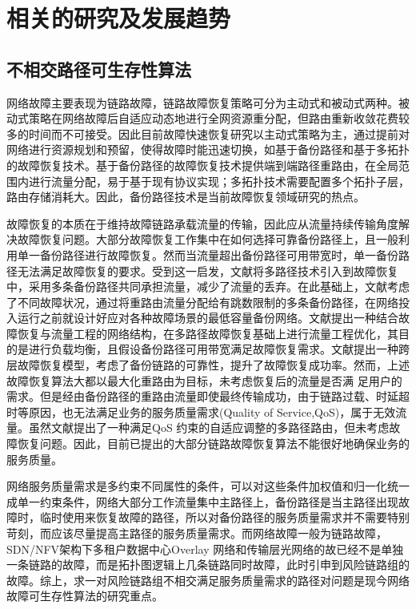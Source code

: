 \section{相关的研究及发展趋势}
\subsection{不相交路径可生存性算法}
网络故障主要表现为链路故障，链路故障恢复策略可分为主动式和被动式两种\cite{kvalbein2006fast,qi2012research}。被动式策略在网络故障后自适应动态地进行全网资源重分配，但路由重新收敛花费较多的时间而不可接受。因此目前故障快速恢复研究以主动式策略为主，通过提前对网络进行资源规划和预留，使得故障时能迅速切换，如基于备份路径和基于多拓扑\cite{shand2010ip}的故障恢复技术。基于备份路径的故障恢复技术提供端到端路径重路由，在全局范围内进行流量分配，易于基于现有协议实现；多拓扑技术需要配置多个拓扑子层，路由存储消耗大。因此，备份路径技术是当前故障恢复领域研究的热点\cite{yang2014keep,wang2010r3,banner2010designing,suchara2011network,zheng2014cross}。

故障恢复的本质在于维持故障链路承载流量的传输，因此应从流量持续传输角度解决故障恢复问题。大部分故障恢复工作集中在如何选择可靠备份路径上，且一般利用单一备份路径进行故障恢复。然而当流量超出备份路径可用带宽时，单一备份路径无法满足故障恢复的要求。受到这一启发，文献\cite{wang2010r3}将多路径技术引入到故障恢复中，采用多条备份路径共同承担流量，减少了流量的丢弃。在此基础上，文献\cite{banner2010designing}考虑了不同故障状况，通过将重路由流量分配给有跳数限制的多条备份路径，在网络投入运行之前就设计好应对各种故障场景的最低容量备份网络。文献\cite{suchara2011network}提出一种结合故障恢复与流量工程的网络结构，在多路径故障恢复基础上进行流量工程优化，其目的是进行负载均衡，且假设备份路径可用带宽满足故障恢复需求。文献\cite{zheng2014cross}提出一种跨层故障恢复模型，考虑了备份链路的可靠性，提升了故障恢复成功率。然而，上述故障恢复算法大都以最大化重路由为目标，未考虑恢复后的流量是否满
足用户的需求。但是经由备份路径的重路由流量即使最终传输成功，由于链路过载、时延超时等原因，也无法满足业务的服务质量需求(Quality of Service,QoS)，属于无效流量。虽然文献\cite{misra2009polynomial}提出了一种满足QoS 约束的自适应调整的多路径路由，但未考虑故障恢复问题。因此，目前已提出的大部分链路故障恢复算法不能很好地确保业务的服务质量。

网络服务质量需求是多约束不同属性的条件，可以对这些条件加权值和归一化统一成单一约束条件，网络大部分工作流量集中主路径上，备份路径是当主路径出现故障时，临时使用来恢复故障的路径，所以对备份路径的服务质量需求并不需要特别苛刻，而应该尽量提高主路径的服务质量需求。而网络故障一般为链路故障，SDN/NFV架构下多租户数据中心Overlay 网络和传输层光网络的故已经不是单独一条链路的故障，而是拓扑图逻辑上几条链路同时故障，此时引申到风险链路组的故障。综上，求一对风险链路组不相交满足服务质量需求的路径对问题是现今网络故障可生存性算法的研究重点。



